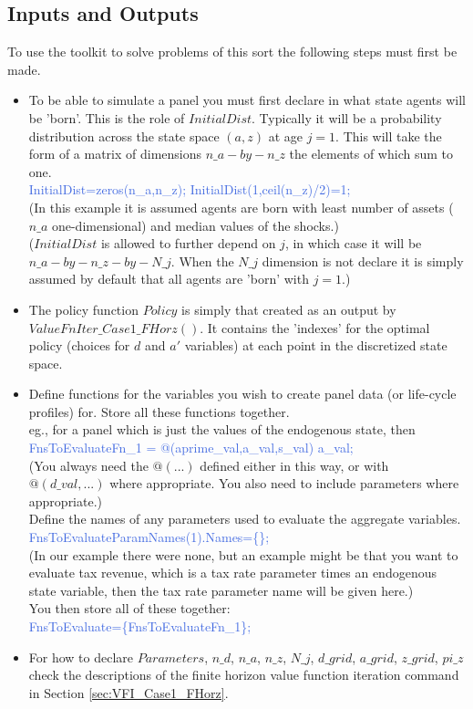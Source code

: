 \subsection{Inputs and Outputs}
To use the toolkit to solve problems of this sort the following steps must first be made.
\begin{itemize}
 \item To be able to simulate a panel you must first declare in what state agents will be 'born'. This is the
   role of $InitialDist$. Typically it will be a probability distribution across the state space $(a,z)$ at age $j=1$.
   This will take the form of a matrix of dimensions $n\_{}a-by-n\_{}z$ the elements of which sum to one. \\
   \textcolor{RoyalBlue}{InitialDist=zeros(n\_{}a,n\_{}z); InitialDist(1,ceil(n\_{}z)/2)=1;} \\
   (In this example it is assumed agents are born with least number of assets ($n\_{}a$ one-dimensional) and median values of the shocks.) \\
   ($InitialDist$ is allowed to further depend on $j$, in which case it will be $n\_{}a-by-n\_{}z-by-N\_{}j$. When the $N\_{}j$ dimension
   is not declare it is simply assumed by default that all agents are 'born' with $j=1$.)
 \item The policy function $Policy$ is simply that created as an output by $ValueFnIter\_{}Case1\_{}FHorz()$. It contains the 'indexes' for
   the optimal policy (choices for $d$ and $a'$ variables) at each point in the discretized state space.
 \item Define functions for the variables you wish to create panel data (or life-cycle profiles) for.
   Store all these functions together. \\
   eg., for a panel which is just the values of the endogenous state, then \\
   \textcolor{RoyalBlue}{FnsToEvaluateFn\_{}1 = @(aprime\_{}val,a\_{}val,s\_{}val) a\_{}val;} \\
   (You always need the $@(...)$ defined either in this way, or with $@(d\_{}val,...)$ where appropriate. You also need to include parameters where appropriate.) \\
   Define the names of any parameters used to evaluate the aggregate variables. \\
   \textcolor{RoyalBlue}{FnsToEvaluateParamNames(1).Names=\{\};} \\
   (In our example there were none, but an example might be that you want to evaluate tax revenue, which is a tax rate parameter times an endogenous state variable, then the tax rate
    parameter name will be given here.) \\
   You then store all of these together: \\
   \textcolor{RoyalBlue}{FnsToEvaluate=\{FnsToEvaluateFn\_{}1\};}
 \item For how to declare $Parameters$, $n\_{}d$, $n\_{}a$, $n\_{}z$, $N\_{}j$, $d\_{}grid$, $a\_{}grid$, $z\_{}grid$, $pi\_{}z$
   check the descriptions of the finite horizon value function iteration command in Section \ref{sec:VFI_Case1_FHorz}.
\end{itemize}

